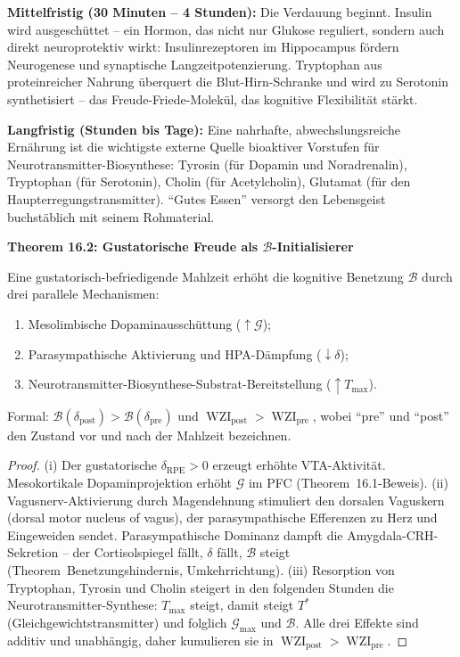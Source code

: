 ﻿\documentclass[12pt,a4paper]{report}
\theoremstyle{plain}
\theoremstyle{definition}
\theoremstyle{remark}
\DeclareMathOperator{\WZI}{WZI}
\begin{document}
	\textbf{Mittelfristig (30 Minuten -- 4 Stunden):}
	Die Verdauung beginnt. Insulin wird ausgeschüttet -- ein Hormon,
	das nicht nur Glukose reguliert, sondern auch direkt
	neuroprotektiv wirkt: Insulinrezeptoren im Hippocampus
	fördern Neurogenese und synaptische Langzeitpotenzierung.
	Tryptophan aus proteinreicher Nahrung überquert die
	Blut-Hirn-Schranke und wird zu Serotonin synthetisiert --
	das Freude-Friede-Molekül, das kognitive Flexibilität stärkt.

	\textbf{Langfristig (Stunden bis Tage):}
	Eine nahrhafte, abwechslungsreiche Ernährung ist die wichtigste
	externe Quelle bioaktiver Vorstufen für Neurotransmitter-Biosynthese:
	Tyrosin (für Dopamin und Noradrenalin), Tryptophan (für Serotonin),
	Cholin (für Acetylcholin), Glutamat (für den Haupterregungstransmitter).
	``Gutes Essen'' versorgt den Lebensgeist buchstäblich mit seinem
	Rohmaterial.

	
	\noindent\textbf{Theorem 16.2: Gustatorische Freude als $\mathcal{B}$-Initialisierer}

		Eine gustatorisch-befriedigende Mahlzeit erhöht die kognitive
		Benetzung $\mathcal{B}$ durch drei parallele Mechanismen:
		\begin{enumerate}[label=(\roman*), leftmargin=1.8cm, topsep=2pt]
			\item Mesolimbische Dopaminausschüttung ($\uparrow \mathcal{G}$);
			\item Parasympathische Aktivierung und HPA-Dämpfung ($\downarrow \delta$);
			\item Neurotransmitter-Biosynthese-Substrat-Bereitstellung ($\uparrow T_{\max}$).
		\end{enumerate}
		Formal: $\mathcal{B}(\delta_{\mathrm{post}}) > \mathcal{B}(\delta_{\mathrm{pre}})$
		und $\WZI_{\mathrm{post}} > \WZI_{\mathrm{pre}}$, wobei ``pre'' und ``post''
		den Zustand vor und nach der Mahlzeit bezeichnen.


	\begin{proof}
		(i) Der gustatorische $\delta_{\mathrm{RPE}} > 0$ erzeugt erhöhte VTA-Aktivität.
		Mesokortikale Dopaminprojektion erhöht $\mathcal{G}$ im PFC (Theorem~16.1-Beweis).
		(ii) Vagusnerv-Aktivierung durch Magendehnung stimuliert den dorsalen
		Vaguskern (dorsal motor nucleus of vagus), der para\-sympathische
		Efferenzen zu Herz und Eingeweiden sendet. Parasympathische Dominanz
		dampft die Amygdala-CRH-Sekretion -- der Cortisolspiegel fällt,
		$\delta$ fällt, $\mathcal{B}$ steigt (Theorem~Benetzungshindernis, Umkehrrichtung).
		(iii) Resorption von Tryptophan, Tyrosin und Cholin steigert
		in den folgenden Stunden die Neurotransmitter-Synthese:
		$T_{\max}$ steigt, damit steigt $T^*$ (Gleichgewichtstransmitter) und
		folglich $\mathcal{G}_{\max}$ und $\mathcal{B}$.
		Alle drei Effekte sind additiv und unabhängig,
		daher kumulieren sie in $\WZI_{\mathrm{post}} > \WZI_{\mathrm{pre}}$. \hfill
	\end{proof}
\end{document}
